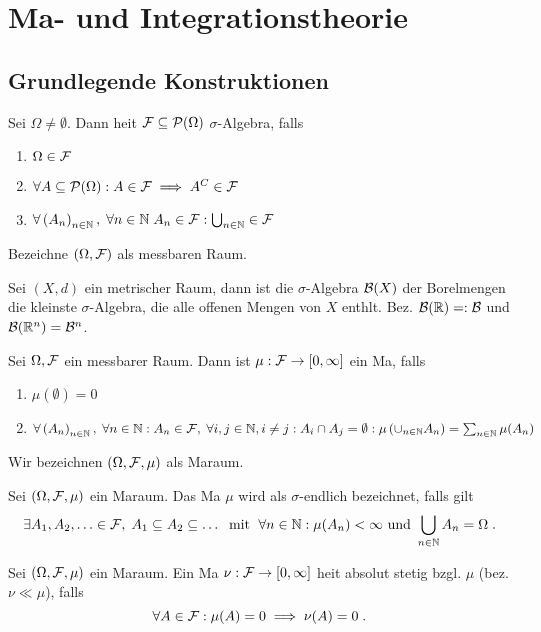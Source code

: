 \chapter{Ma\s{}- und Integrationstheorie}
\section{Grundlegende Konstruktionen}
\begin{definition}
	Sei \(\Omega \neq \emptyset\). Dann hei\s t \(\mathcal{F} \subseteq \mathcal{P} (\Omega)\)  $\sigma$-Algebra, falls
	\begin{enumerate}[noitemsep]
		\item \(\Omega \in \mathcal{F}\)
		\item \(\forall A \subseteq \mathcal{P}(\Omega): A\in \mathcal{F} \implies A^C \in \mathcal{F}\)
		\item \(\forall \left (A_n\right )_{n\in \mathbb{N}},\; \forall n\in \mathbb{N}\; A_n \in \mathcal{F}: \bigcup_{n\in\mathbb{N}}\in\mathcal{F}\)
	\end{enumerate}
	Bezeichne \((\Omega, \mathcal{F})\) als messbaren Raum.
\end{definition}
\begin{rem}
	Sei \((X, d)\) ein metrischer Raum, dann ist die $\sigma$-Algebra \(\mathcal{B}(X)\) der Borelmengen die kleinste $\sigma$-Algebra, die alle offenen Mengen von $X$ enth\as lt. Bez. \(\mathcal{B}(\mathbb{R}) =: \mathcal{B}\) und \(\mathcal{B}(\mathbb{R}^n) = \mathcal{B}^n\).
\end{rem}
\begin{definition}
	Sei \(\Omega, \mathcal{F}\) ein messbarer Raum. Dann ist \(\mu: \mathcal{F} \to [0,\infty]\) ein Ma\s{}, falls
	\begin{enumerate}[noitemsep]
		\item \(\mu(\emptyset) = 0\)
		\item \(\forall \left (A_n\right )_{n\in \mathbb{N}}, \; \forall n\in\mathbb{N}: A_n \in \mathcal{F}, \; \forall i, j \in \mathbb{N}, i\neq j: A_i\cap A_j = \emptyset: \mu\left( \cup_{n\in\mathbb{N}} A_n\right) = \sum_{n\in\mathbb{N}} \mu(A_n)\)
	\end{enumerate}
	Wir bezeichnen \((\Omega, \mathcal{F}, \mu)\) als Ma\s raum.
\end{definition}
\begin{definition}
	Sei \((\Omega, \mathcal{F}, \mu)\) ein Ma\s raum. Das Ma\s{} $\mu$ wird als $\sigma$-endlich bezeichnet, falls gilt
	\[\exists A_1, A_2,\ldots \in \mathcal{F},\; A_1\subseteq A_2\subseteq \ldots \;\text{ mit }\; \forall n \in \mathbb{N}: \mu(A_n) < \infty \text{ und } \bigcup_{n\in \mathbb{N}}A_n = \Omega\;.\]
\end{definition}
\begin{definition}
	Sei \((\Omega, \mathcal{F}, \mu)\) ein Ma\s raum. Ein Ma\s{} \(\nu: \mathcal{F} \to [0,\infty]\) hei\s t absolut stetig bzgl. \(\mu\) (bez. \(\nu \ll \mu\)), falls 
	\[\forall A\in \mathcal{F}: \mu(A) = 0 \implies \nu(A) = 0\;.\]
\end{definition}

